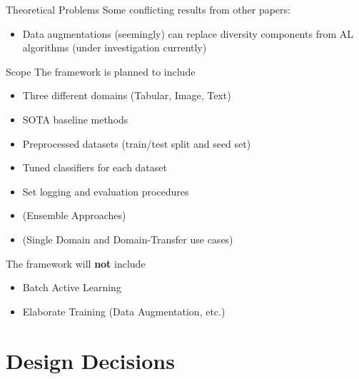 \documentclass[aspectratio=169, 11pt, invertlogo]{ismll-slides}
\begin{document}

\begin{frame}[fragile]{Theoretical Problems}
	Some conflicting results from other papers:
	\begin{itemize}
		\item Data augmentations (seemingly) can replace diversity components from AL algorithms (under investigation currently)
	\end{itemize}
\end{frame}


\begin{frame}[fragile]{Scope}
	The framework is planned to include
	\begin{itemize}
		\item Three different domains (Tabular, Image, Text)
		\item SOTA baseline methods 
		\item Preprocessed datasets (train/test split and seed set)
		\item Tuned classifiers for each dataset
		\item Set logging and evaluation procedures
		\item (Ensemble Approaches)
		\item (Single Domain and Domain-Transfer use cases)
	\end{itemize}
	The framework will \textbf{not} include
	\begin{itemize}
		\item Batch Active Learning
		\item Elaborate Training (Data Augmentation, etc.)
	\end{itemize}
\end{frame}


\section{Design Decisions}

\end{document}
